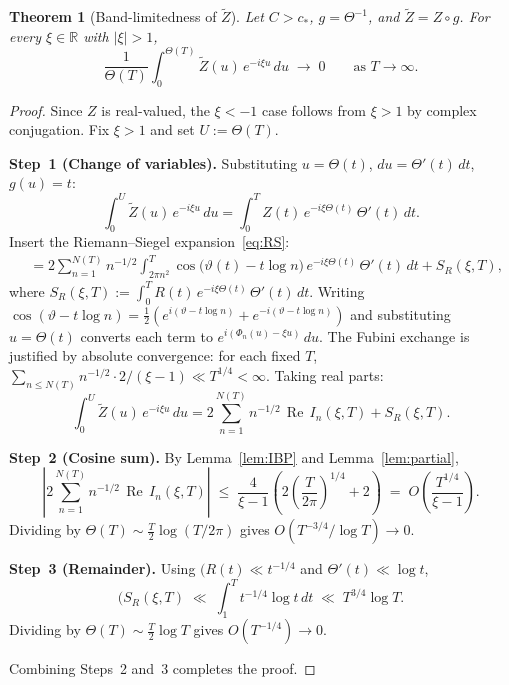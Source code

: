 \documentclass[12pt]{amsart}
\newtheorem{theorem}{Theorem}[section]
\theoremstyle{definition}
\theoremstyle{remark}
\DeclareMathOperator{\Rea}{Re}
\newcommand{\abs} [en.wikipedia](https://en.wikipedia.org/wiki/Z_function){\left|#1\right|}
\begin{document}
\begin{theorem}[Band-limitedness of $\widetilde{Z}$]\label{thm:band}
Let $C>c_*$, $g=\Theta^{-1}$, and $\widetilde{Z}=Z\circ g$.
For every $\xi\in\mathbb{R}$ with $|\xi|>1$,
\[
  \frac{1}{\Theta(T)}\int_{0}^{\Theta(T)}
  \widetilde{Z}(u)\,e^{-i\xi u}\,du
  \;\longrightarrow\;0
  \qquad\text{as }T\to\infty.
\]
\end{theorem}

\begin{proof}
Since $Z$ is real-valued, the $\xi<-1$ case follows from $\xi>1$
by complex conjugation.  Fix $\xi>1$ and set $U:=\Theta(T)$.

\medskip\noindent
\textbf{Step~1 (Change of variables).}
Substituting $u=\Theta(t)$, $du=\Theta'(t)\,dt$, $g(u)=t$:
\[
  \int_{0}^{U}\widetilde{Z}(u)\,e^{-i\xi u}\,du
  =\int_{0}^{T}Z(t)\,e^{-i\xi\Theta(t)}\,\Theta'(t)\,dt.
\]
Insert the Riemann--Siegel expansion~\eqref{eq:RS}:
\begin{align*}
  &= 2\sum_{n=1}^{N(T)}n^{-1/2}
     \int_{2\pi n^2}^{T}
     \cos\!\bigl(\vartheta(t)-t\log n\bigr)
     \,e^{-i\xi\Theta(t)}\,\Theta'(t)\,dt
     + S_R(\xi,T),
\end{align*}
where $S_R(\xi,T):=\int_{0}^{T}R(t)\,e^{-i\xi\Theta(t)}\,\Theta'(t)\,dt$.
Writing $\cos(\vartheta-t\log n)=\tfrac{1}{2}(e^{i(\vartheta-t\log n)}
+e^{-i(\vartheta-t\log n)})$ and substituting $u=\Theta(t)$ converts
each term to $e^{i(\Phi_n(u)-\xi u)}\,du$.  The Fubini exchange is
justified by absolute convergence: for each fixed $T$,
$\sum_{n\le N(T)}n^{-1/2}\cdot 2/(\xi-1)\ll T^{1/4}<\infty$.
Taking real parts:
\begin{equation}\label{eq:decomp}
  \int_{0}^{U}\widetilde{Z}(u)\,e^{-i\xi u}\,du
  =2\sum_{n=1}^{N(T)}n^{-1/2}\,\Rea\,I_n(\xi,T)+S_R(\xi,T).
\end{equation}

\medskip\noindent
\textbf{Step~2 (Cosine sum).}
By Lemma~\ref{lem:IBP} and Lemma~\ref{lem:partial},
\[
  \left|2\sum_{n=1}^{N(T)}n^{-1/2}\,\Rea\,I_n(\xi,T)\right|
  \;\le\;\frac{4}{\xi-1}
  \!\left(2\!\left(\frac{T}{2\pi}\right)^{1/4}+2\right)
  \;=\;O\!\left(\frac{T^{1/4}}{\xi-1}\right).
\]
Dividing by $\Theta(T)\sim\tfrac{T}{2}\log(T/2\pi)$ gives
$O(T^{-3/4}/\log T)\to 0$.

\medskip\noindent
\textbf{Step~3 (Remainder).}
Using $\abs{R(t)}\ll t^{-1/4}$ and $\Theta'(t)\ll\log t$,
\[
  \abs{S_R(\xi,T)}
  \;\ll\;\int_{1}^{T}t^{-1/4}\log t\,dt
  \;\ll\;T^{3/4}\log T.
\]
Dividing by $\Theta(T)\sim\tfrac{T}{2}\log T$ gives $O(T^{-1/4})\to 0$.

\medskip\noindent
Combining Steps~2 and~3 completes the proof.
\end{proof}
\end{document}
